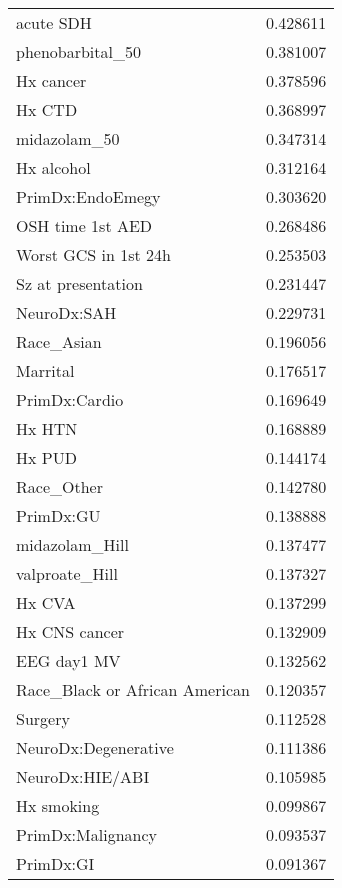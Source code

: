 \begin{tabular}{lr}
acute SDH                      &   0.428611 \\
phenobarbital\_50               &   0.381007 \\
Hx cancer                      &   0.378596 \\
Hx CTD                         &   0.368997 \\
midazolam\_50                   &   0.347314 \\
Hx alcohol                     &   0.312164 \\
PrimDx:EndoEmegy               &   0.303620 \\
OSH time 1st AED               &   0.268486 \\
Worst GCS in 1st 24h           &   0.253503 \\
Sz at presentation             &   0.231447 \\
NeuroDx:SAH                    &   0.229731 \\
Race\_Asian                     &   0.196056 \\
Marrital                       &   0.176517 \\
PrimDx:Cardio                  &   0.169649 \\
Hx HTN                         &   0.168889 \\
Hx PUD                         &   0.144174 \\
Race\_Other                     &   0.142780 \\
PrimDx:GU                      &   0.138888 \\
midazolam\_Hill                 &   0.137477 \\
valproate\_Hill                 &   0.137327 \\
Hx CVA                         &   0.137299 \\
Hx CNS cancer                  &   0.132909 \\
EEG day1 MV                    &   0.132562 \\
Race\_Black or African American &   0.120357 \\
Surgery                        &   0.112528 \\
NeuroDx:Degenerative           &   0.111386 \\
NeuroDx:HIE/ABI                &   0.105985 \\
Hx smoking                     &   0.099867 \\
PrimDx:Malignancy              &   0.093537 \\
PrimDx:GI                      &   0.091367 \\

\end{tabular}
